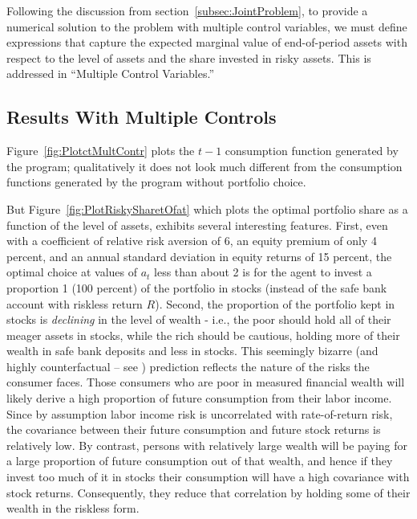 \documentclass[titlepage, headings=optiontotocandhead]{econark}
\begin{document}
Following the discussion from section~\ref{subsec:JointProblem}, to provide a numerical solution to the problem
with multiple control variables, we must define expressions that capture the expected marginal value of end-of-period
assets with respect to the level of assets and the share invested in risky assets. This is addressed in ``Multiple Control Variables.''

\hypertarget{results-with-multiple-controls}{}
\subsection{Results With Multiple Controls}\label{subsec:results-with-multiple-controls}

Figure~\ref{fig:PlotctMultContr} plots the $t-1$ consumption function generated by the program; qualitatively it does not look much different from the consumption functions generated by the program without portfolio choice.

But Figure~\ref{fig:PlotRiskySharetOfat} which plots the optimal portfolio share as a function of the level of assets, exhibits several interesting features.  First, even with a coefficient of relative risk aversion of 6, an equity premium of only 4 percent, and an annual standard deviation in equity returns of 15 percent, the optimal choice at values of $a_{t}$ less than about 2 is for the agent to invest a proportion 1 (100 percent) of the portfolio in stocks (instead of the safe bank account with riskless return $R$).  Second, the proportion of the portfolio kept in stocks is \textit{declining} in the level of wealth - i.e., the poor should hold all of their meager assets in stocks, while the rich should be cautious, holding more of their wealth in safe bank deposits and less in stocks.  This seemingly bizarre (and highly counterfactual -- see \cite{carroll:richportfolios}) prediction reflects the nature of the risks the consumer faces.  Those consumers who are poor in measured financial wealth will likely derive a high proportion of future consumption from their labor income.  Since by assumption labor income risk is uncorrelated with rate-of-return risk, the covariance between their future consumption and future stock returns is relatively low.  By contrast, persons with relatively large wealth will be paying for a large proportion of future consumption out of that wealth, and hence if they invest too much of it in stocks their consumption will have a high covariance with stock returns.  Consequently, they reduce that correlation by holding some of their wealth in the riskless form.
\end{document}
